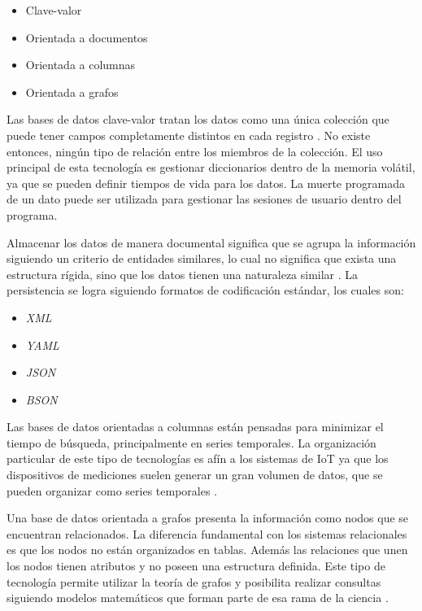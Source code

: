 \begin{itemize}
	\item Clave-valor
	\item Orientada a documentos
	\item Orientada a columnas
	\item Orientada a grafos
\end{itemize}

Las bases de datos clave-valor tratan los datos como una única colección que puede tener campos completamente distintos en cada registro \citep{nguyen2015zing}.
No existe entonces, ningún tipo de relación entre los miembros de la colección. El uso principal de esta tecnología es gestionar diccionarios dentro de la memoria volátil, ya que se pueden definir tiempos de vida para los datos. La muerte programada de un dato puede ser utilizada para gestionar las sesiones de usuario dentro del programa.

Almacenar los datos de manera documental significa que se agrupa la información siguiendo un criterio de entidades similares, lo cual no significa que exista una estructura rígida, sino que los datos tienen una naturaleza similar \citep{gutierrez2019herramienta}.
La persistencia se logra siguiendo formatos de codificación estándar, los cuales son:

\begin{itemize}
	\item \emph{XML}
	\item \emph{YAML}
	\item \emph{JSON}
	\item \emph{BSON}
\end{itemize}

Las bases de datos orientadas a columnas están pensadas para minimizar el tiempo de búsqueda, principalmente en series temporales.
La organización particular de este tipo de tecnologías es afín a los sistemas de IoT ya que los dispositivos de mediciones suelen generar un gran volumen de datos, que se pueden organizar como series temporales \citep{abadi2009column}.

Una base de datos orientada a grafos presenta la información como nodos que se encuentran relacionados.
La diferencia fundamental con los sistemas relacionales es que los nodos no están organizados en tablas.
Además las relaciones que unen los nodos tienen atributos y no poseen una estructura definida.
Este tipo de tecnología permite utilizar la teoría de grafos y posibilita realizar consultas siguiendo modelos matemáticos que forman parte de esa rama de la ciencia \citep{gyssens1994graph}.

